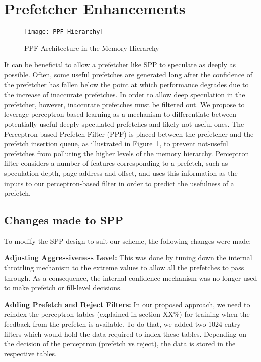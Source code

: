 \section{Prefetcher Enhancements}
\label{Enhancements}

\begin{figure}
  \begin{center}
  \texttt{[image: PPF\_Hierarchy]}
  \caption{PPF Architecture in the Memory Hierarchy}
  \label{fig:PPF_Hierarchy}
  \end{center}
\end{figure}

It can be beneficial to allow a prefetcher like SPP to speculate as 
deeply as possible. Often, some useful prefetches are generated long 
after the confidence of the prefetcher has fallen below the point at 
which performance degrades due to the increase of inaccurate prefetches.  
In order to allow deep speculation in the prefetcher, however, inaccurate
prefetches must be filtered out.  We propose to leverage
perceptron-based learning as a mechanism to differentiate between
potentially useful deeply speculated prefetches and likely not-useful
ones. The Perceptron based Prefetch Filter (PPF) is placed between the
prefetcher and the prefetch insertion queue, as illustrated in
Figure~\ref{fig:PPF_Hierarchy}, to prevent not-useful prefetches from
polluting the higher levels of the memory hierarchy.
Perceptron filter considers a number of features corresponding to a
prefetch, such as speculation depth, page address and offset, and uses
this information as the inputs to our perceptron-based filter in order
to predict the usefulness of a prefetch.  

\subsection{Changes made to SPP}
\label{Enhancements-SPP}
To modify the SPP design to suit our scheme, the following changes
were made:

\noindent \textbf{Adjusting Aggressiveness Level:}
This was done by tuning down the internal throttling mechanism to the 
extreme values to allow all the prefetches to pass through. As a 
consequence, the internal confidence mechanism was no longer used
to make prefetch or fill-level decisions.

\noindent \textbf{Adding Prefetch and Reject Filters:}
In our proposed approach, we need to reindex the perceptron tables (explained in
section XX\%) for training when the feedback from the prefetch is available.
To do that, we added two 1024-entry filters which would hold the data required to index
these tables. Depending on the decision of the perceptron (prefetch vs reject), the
data is stored in the respective tables.

